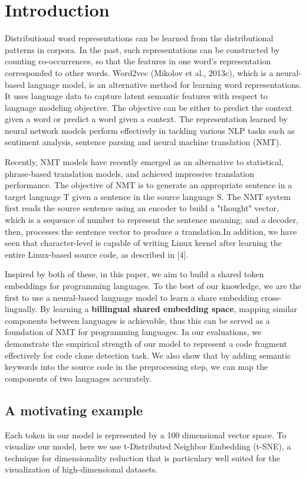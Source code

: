 \section{Introduction}

Distributional word representations can be learned from the distributional patterns in corpora. In the past, such representations can be constructed by counting co-occurrences, so that the features in one word's representation corresponded to other words. Word2vec (Mikolov et al., 2013c), which is a neural-based language model, is an alternative method for learning word representations. It uses language data to capture latent semantic features with respect to language modeling objective. The objective can be either to predict the context given a word or predict a word given a context. The representation learned by neural network models perform effectively in tackling various NLP tasks such as sentiment analysis, sentence parsing and neural machine translation (NMT).

Recently, NMT models have recently emerged as an alternative to statistical, phrase-based translation models, and achieved impressive translation performance. The objective of NMT is to generate an appropriate sentence in a target language T given a sentence in the source language S. The NMT system first reads the source sentence using an encoder to build a "thought" vector, which is a sequence of number to represent the sentence meaning; and a decoder, then, processes the sentence vector to produce a translation.In addition, we have seen that character-level is capable of writing Linux kernel after learning the entire Linux-based source code, as described in [4]. 

Inspired by both of these, in this paper, we aim to build a shared token embeddings for programming languages. To the best of our knowledge, we are the first to use a neural-based language model to learn a share embedding cross-lingually. By learning a \textbf{billingual shared embedding space}, mapping similar components between languages is achievable, thus this can be served as a foundation of NMT for programming languages. In our evaluations, we demonstrate the empirical strength of our model to represent a code fragment effectively for code clone detection task. We also show that by adding semantic keywords into the source code in the preprocessing step, we can map the components of two languages accurately. 



\subsection{A motivating example}
Each token in our model is represented by a 100 dimensional vector space. To visualize our model, here we use t-Distributed Neighbor Embedding (t-SNE), a technique for dimensionality reduction that is particulary well suited for the visualization of high-dimensional datasets. 

